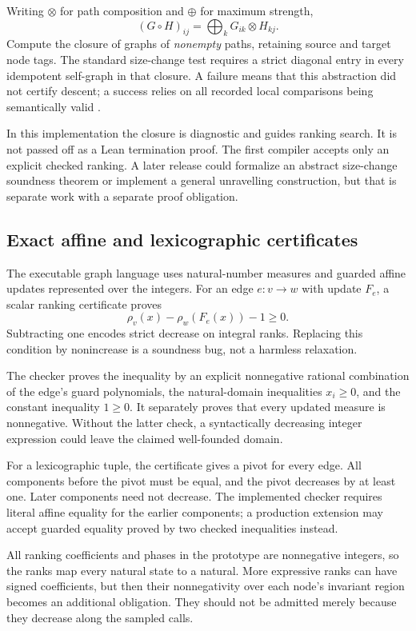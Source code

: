 Writing $\otimes$ for path composition and $\oplus$ for maximum strength,
\[
 (G\circ H)_{ij}=\bigoplus_k G_{ik}\otimes H_{kj}.
\]
Compute the closure of graphs of \emph{nonempty} paths, retaining source and
target node tags. The standard size-change test requires a strict diagonal
entry in every idempotent self-graph in that closure. A failure means that this
abstraction did not certify descent; a success relies on all recorded local
comparisons being semantically valid \cite{cycleq,unravelling}.

In this implementation the closure is diagnostic and guides ranking search.
It is not passed off as a Lean termination proof. The first compiler accepts
only an explicit checked ranking. A later release could formalize an abstract
size-change soundness theorem or implement a general unravelling construction,
but that is separate work with a separate proof obligation.

\subsection{Exact affine and lexicographic certificates}

The executable graph language uses natural-number measures and guarded affine
updates represented over the integers. For an edge $e:v\to w$ with update
$F_e$, a scalar ranking certificate proves
\[
 \rho_v(x)-\rho_w(F_e(x))-1\ge0.
\]
Subtracting one encodes strict decrease on integral ranks. Replacing this
condition by nonincrease is a soundness bug, not a harmless relaxation.

The checker proves the inequality by an explicit nonnegative rational
combination of the edge's guard polynomials, the natural-domain inequalities
$x_i\ge0$, and the constant inequality $1\ge0$. It separately proves that every
updated measure is nonnegative. Without the latter check, a syntactically
decreasing integer expression could leave the claimed well-founded domain.

For a lexicographic tuple, the certificate gives a pivot for every edge. All
components before the pivot must be equal, and the pivot decreases by at least
one. Later components need not decrease. The implemented checker requires
literal affine equality for the earlier components; a production extension may
accept guarded equality proved by two checked inequalities instead.

All ranking coefficients and phases in the prototype are nonnegative integers,
so the ranks map every natural state to a natural. More expressive ranks can
have signed coefficients, but then their nonnegativity over each node's invariant
region becomes an additional obligation. They should not be admitted merely
because they decrease along the sampled calls.

